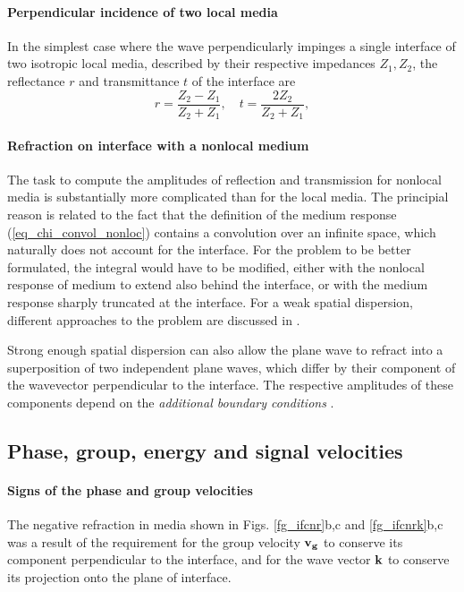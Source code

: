 \paragraph{Perpendicular incidence of two local media} %
In the simplest case where the wave perpendicularly impinges a single interface of two isotropic local media, described by their respective impedances $Z_1, Z_2$, the reflectance $r$ and transmittance $t$ of the interface are
\begin{equation} r = \frac{Z_2 - Z_1}{Z_2+Z_1}, \quad t = \frac{2 Z_2}{Z_2 + Z_1}, \label{eq_reflection}\end{equation}

\paragraph{Refraction on interface with a nonlocal medium}   %
The task to compute the amplitudes of reflection and transmission for nonlocal media is substantially more complicated than for the local media. The principial reason is related to the fact that the definition of the medium response (\ref{eq_chi_convol_nonloc}) contains a convolution over an infinite space, which naturally does not account for the interface. For the problem to be better formulated, the integral would have to be modified, either with the nonlocal response of medium to extend also behind the interface, or with the medium response sharply truncated at the interface. For a weak spatial dispersion, different approaches to the problem are discussed in \cite{golubkov1995boundary}.

Strong enough spatial dispersion can also allow the plane wave to refract into a superposition of two independent plane waves, which differ by their component of the wavevector perpendicular to the interface. The respective amplitudes of these components depend on the \textit{additional boundary conditions} \cite{agranovich2006spatial}.


\subsection{Phase, group, energy and signal velocities}
\label{chap_vfvg}
\paragraph{Signs of the phase and group velocities}%
The negative refraction in media shown in Figs. \ref{fg_ifcnr}b,c and \ref{fg_ifcnrk}b,c was a result of the requirement for the group velocity ${\mathbf{v_g}}$ to conserve its component perpendicular to the interface, and for the wave vector ${\mathbf{k}}$ to conserve its projection onto the plane of interface. 

